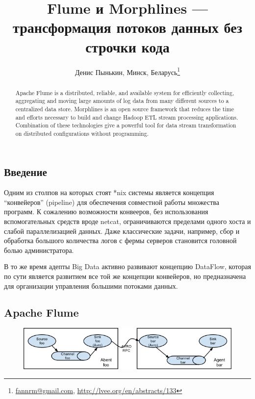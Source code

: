 \documentclass[10pt, a5paper]{article}
\begin{document}
\title{Flume и Morphlines --- трансформация потоков данных без строчки кода}
\author{Денис Пынькин, Минск, Беларусь\footnote{\url{fannrm@gmail.com}, \url{http://lvee.org/en/abstracts/133}}}
\maketitle
\begin{abstract}
Apache Flume is a distributed, reliable, and available system for efficiently collecting, aggregating and moving large amounts of log data from many different sources to a centralized data store.
Morphlines is an open source framework that reduces the time and efforts necessary to build and change Hadoop ETL stream processing applications.
Combination of these technologies give a powerful tool for data stream transformation on distributed configurations without programming.
\end{abstract}
\subsection*{Введение}

Одним из столпов на которых стоят *nix системы является концепция ``конвейеров'' (pipeline) для обеспечения совместной работы множества программ. К сожалению возможности конвееров, без использования вспомогательных средств вроде netcat, ограничиваются пределами одного хоста и слабой параллелизацией данных. Даже классические задачи, например, сбор и обработка большого количества логов с фермы серверов становится головной болью администратора.

В то же время адепты Big Data активно развивают концепцию DataFlow, которая по сути является развитием все той же концепции конвейеров, но предназначена для организации управления большими потоками данных.

\subsection*{Apache Flume}

\begin{figure}[h!]
  \centering
  \includegraphics[scale=0.5]{21_2014_UserGuide_image03.png}
\end{figure}
\end{document}
